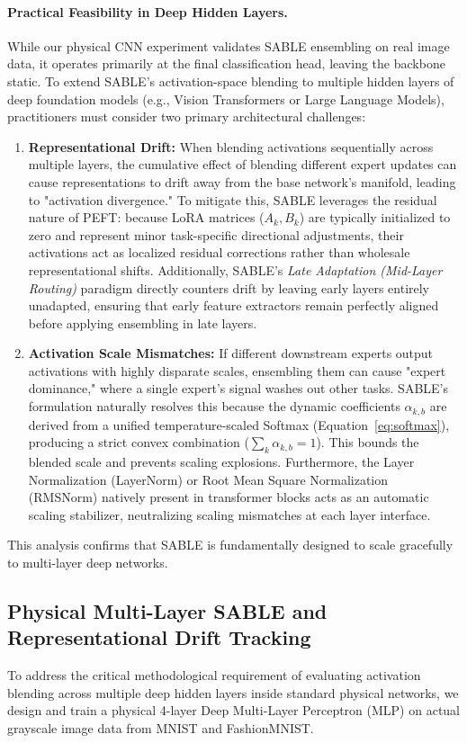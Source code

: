 \paragraph{Practical Feasibility in Deep Hidden Layers.} While our physical CNN experiment validates SABLE ensembling on real image data, it operates primarily at the final classification head, leaving the backbone static. To extend SABLE's activation-space blending to multiple hidden layers of deep foundation models (e.g., Vision Transformers or Large Language Models), practitioners must consider two primary architectural challenges:
\begin{enumerate}
    \item \textbf{Representational Drift:} When blending activations sequentially across multiple layers, the cumulative effect of blending different expert updates can cause representations to drift away from the base network's manifold, leading to "activation divergence." To mitigate this, SABLE leverages the residual nature of PEFT: because LoRA matrices ($A_k, B_k$) are typically initialized to zero and represent minor task-specific directional adjustments, their activations act as localized residual corrections rather than wholesale representational shifts. Additionally, SABLE's \emph{Late Adaptation (Mid-Layer Routing)} paradigm directly counters drift by leaving early layers entirely unadapted, ensuring that early feature extractors remain perfectly aligned before applying ensembling in late layers.
    \item \textbf{Activation Scale Mismatches:} If different downstream experts output activations with highly disparate scales, ensembling them can cause "expert dominance," where a single expert's signal washes out other tasks. SABLE's formulation naturally resolves this because the dynamic coefficients $\alpha_{k, b}$ are derived from a unified temperature-scaled Softmax (Equation~\ref{eq:softmax}), producing a strict convex combination ($\sum_k \alpha_{k, b} = 1$). This bounds the blended scale and prevents scaling explosions. Furthermore, the Layer Normalization (LayerNorm) or Root Mean Square Normalization (RMSNorm) natively present in transformer blocks acts as an automatic scaling stabilizer, neutralizing scaling mismatches at each layer interface.
\end{enumerate}
This analysis confirms that SABLE is fundamentally designed to scale gracefully to multi-layer deep networks.

\subsection{Physical Multi-Layer SABLE and Representational Drift Tracking}
To address the critical methodological requirement of evaluating activation blending across multiple deep hidden layers inside standard physical networks, we design and train a physical 4-layer Deep Multi-Layer Perceptron (MLP) on actual grayscale image data from MNIST and FashionMNIST.

